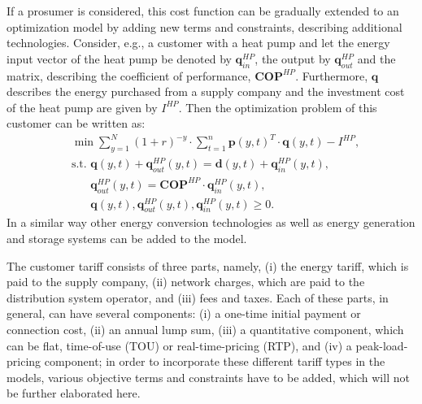 \documentclass[review]{elsarticle}
\begin{document}
If a prosumer is considered, this cost function can be gradually
extended to an optimization model by adding new terms and constraints,
describing additional technologies. Consider, e.g., a customer with a
heat pump and let the energy input vector of the heat pump be denoted
by $\mathbf{q}_{in}^{HP}$, the output by $\mathbf{q}_{out}^{HP}$ and the matrix,
describing the coefficient of performance, $\mathbf{COP}^{HP}$. Furthermore,
$\mathbf{q}$ describes the energy purchased from a supply company and the
investment cost of the heat pump are given by $I^{HP}$. Then the
optimization problem of this customer can be written as: 
\begin{align}
  & \min \sum_{y=1}^{N}(1+r)^{-y} \cdot \sum_{t=1}^{n} \mathbf{p}(y,t)^T \cdot
  \mathbf{q}(y,t) - I^{HP}, \\
  & \textrm{s.t. } \mathbf{q}(y,t) + \mathbf{q}_{out}^{HP} (y,t)  = \mathbf{d}(y,t) +
                     \mathbf{q}_{in}^{HP} (y,t), \\
  & \phantom{\textrm{s.t. }}\mathbf{q}_{out}^{HP}(y,t) = \mathbf{COP}^{HP} \cdot \mathbf{q}_{in}^{HP} (y,t), \\
  & \phantom{\textrm{s.t. }}\mathbf{q}(y,t), \mathbf{q}_{out}^{HP}(y,t), \mathbf{q}_{in}^{HP}(y,t) \geq 0.
\end{align} %
In a similar way other energy conversion technologies as well as
energy generation and storage systems can be added to the model. 

The customer tariff consists of three parts, namely, (i) the energy
tariff, which is paid to the supply company, (ii) network charges,
which are paid to the distribution system operator, and (iii) fees and
taxes. Each of these parts, in general, can have several components:
(i) a one-time initial payment or connection cost, (ii) an annual lump
sum, (iii) a quantitative component, which can be flat, time-of-use (TOU) or real-time-pricing (RTP),
and (iv) a peak-load-pricing component; in order to incorporate these
different tariff types in the models, various objective terms and
constraints have to be added, which will not be further elaborated
here. 
\end{document}
